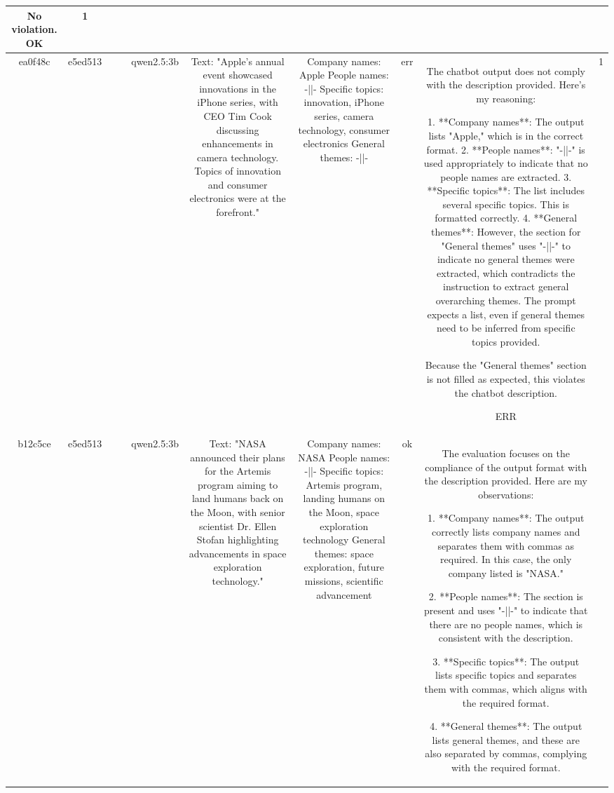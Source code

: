 \begin{table}[h!]
\begin{tabular}{|c|c|c|c|c|c|c|c|c|c|}
No violation.
OK & 1\\
\hline
ea0f48c & e5ed513 &  &  & qwen2.5:3b & Text: "Apple's annual event showcased innovations in the iPhone series, with CEO Tim Cook discussing enhancements in camera technology. Topics of innovation and consumer electronics were at the forefront." & Company names: Apple
People names: -||-
Specific topics: innovation, iPhone series, camera technology, consumer electronics
General themes: -||- & err & The chatbot output does not comply with the description provided. Here's my reasoning:

1. **Company names**: The output lists "Apple," which is in the correct format.
2. **People names**: "-||-" is used appropriately to indicate that no people names are extracted.
3. **Specific topics**: The list includes several specific topics. This is formatted correctly.
4. **General themes**: However, the section for "General themes" uses "-||-" to indicate no general themes were extracted, which contradicts the instruction to extract general overarching themes. The prompt expects a list, even if general themes need to be inferred from specific topics provided.

Because the "General themes" section is not filled as expected, this violates the chatbot description.

ERR & 1\\
\hline
b12c5ce & e5ed513 &  &  & qwen2.5:3b & Text: "NASA announced their plans for the Artemis program aiming to land humans back on the Moon, with senior scientist Dr. Ellen Stofan highlighting advancements in space exploration technology." & Company names: NASA
People names: -||-
Specific topics: Artemis program, landing humans on the Moon, space exploration technology
General themes: space exploration, future missions, scientific advancement & ok & The evaluation focuses on the compliance of the output format with the description provided. Here are my observations:

1. **Company names**: The output correctly lists company names and separates them with commas as required. In this case, the only company listed is "NASA."

2. **People names**: The section is present and uses "-||-" to indicate that there are no people names, which is consistent with the description.

3. **Specific topics**: The output lists specific topics and separates them with commas, which aligns with the required format.

4. **General themes**: The output lists general themes, and these are also separated by commas, complying with the required format.


\end{tabular}
\end{table}

